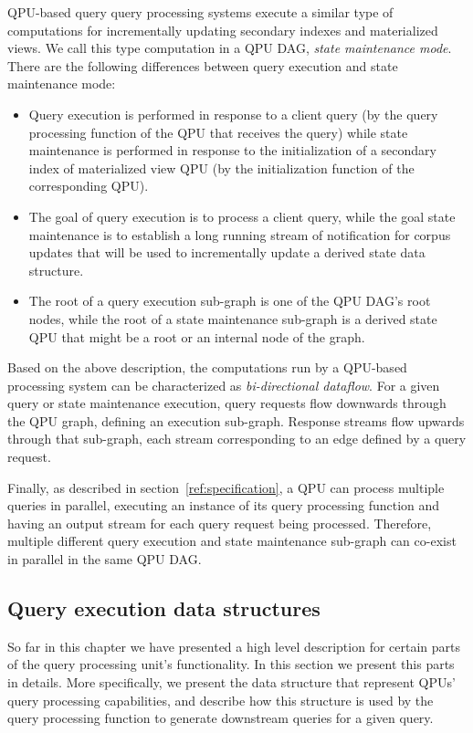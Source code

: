 \medskip
QPU-based query query processing systems execute a similar type of computations for incrementally updating
secondary indexes and materialized views.
We call this type computation in a QPU DAG, \textit{state maintenance mode}.
There are the following differences between query execution and state maintenance mode:
\begin{itemize}
  \item Query execution is performed in response to a client query (by the query processing function of the QPU that receives the query)
  while state maintenance is performed in response to the initialization of a secondary index of materialized view QPU
  (by the initialization function of the corresponding QPU).
  \item The goal of query execution is to process a client query,
  while the goal state maintenance is to establish a long running stream of notification for corpus updates that
  will be used to incrementally update a derived state data structure.
  \item The root of a query execution sub-graph is one of the QPU DAG's root nodes,
  while the root of a state maintenance sub-graph is a derived state QPU that might be a root or an internal node of the
  graph.
\end{itemize}

\medskip
\noindent
Based on the above description, the computations run by a QPU-based processing system can be characterized as
\textit{bi-directional dataflow}.
For a given query or state maintenance execution,
query requests flow downwards through the QPU graph, defining an execution sub-graph.
Response streams flow upwards through that sub-graph, each stream corresponding to an edge defined by a query request.

\medskip
\noindent
Finally, as described in section~\ref{ref:specification}, a QPU can process multiple queries in parallel,
executing an instance of its query processing function and having an output stream for each query request being processed.
Therefore, multiple different query execution and state maintenance sub-graph can co-exist in parallel in the same QPU DAG.


\subsection{Query execution data structures}

So far in this chapter we have presented a high level description for certain parts of the query processing unit's
functionality.
In this section we present this parts in details.
More specifically, we present the data structure that represent QPUs' query processing capabilities,
and describe how this structure is used by the query processing function to generate downstream queries for a given query.

